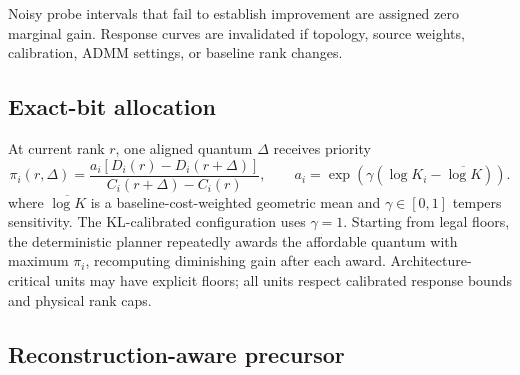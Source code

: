\documentclass[10pt]{article}
\begin{document}
Noisy probe intervals that fail to establish improvement are assigned zero
marginal gain. Response curves are invalidated if topology, source weights,
calibration, ADMM settings, or baseline rank changes.

\subsection{Exact-bit allocation}

At current rank $r$, one aligned quantum $\Delta$ receives priority
\[
 \pi_i(r,\Delta)=
 \frac{a_i\left[D_i(r)-D_i(r+\Delta)\right]}
 {C_i(r+\Delta)-C_i(r)},
 \qquad
 a_i=\exp\!\left(\gamma(\log K_i-\overline{\log K})\right).
 \tag{5}
\]
where $\overline{\log K}$ is a baseline-cost-weighted geometric mean and
$\gamma\in[0,1]$ tempers sensitivity. The KL-calibrated configuration uses
$\gamma=1$. Starting from legal floors, the deterministic planner repeatedly
awards the affordable quantum with maximum $\pi_i$, recomputing diminishing
gain after each award. Architecture-critical units may have explicit floors;
all units respect calibrated response bounds and physical rank caps.

\begin{center}
\end{center}

\subsection{Reconstruction-aware precursor}
\end{document}

